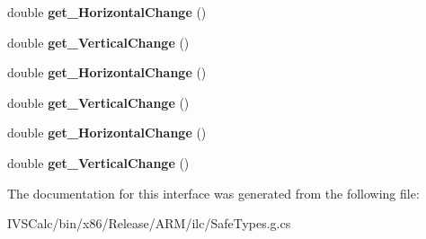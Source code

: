 \begin{DoxyCompactItemize}
double {\bfseries get\+\_\+\+Horizontal\+Change} ()
\item 
\mbox{\label{interface_windows_1_1_u_i_1_1_xaml_1_1_controls_1_1_primitives_1_1_i_drag_delta_event_args_a1bbac76823f97556984152912a0e5e7c}} 
double {\bfseries get\+\_\+\+Vertical\+Change} ()
\item 
\mbox{\label{interface_windows_1_1_u_i_1_1_xaml_1_1_controls_1_1_primitives_1_1_i_drag_delta_event_args_a9e4c99f8e8e4aa64d6a6c0ce91eb070a}} 
double {\bfseries get\+\_\+\+Horizontal\+Change} ()
\item 
\mbox{\label{interface_windows_1_1_u_i_1_1_xaml_1_1_controls_1_1_primitives_1_1_i_drag_delta_event_args_a1bbac76823f97556984152912a0e5e7c}} 
double {\bfseries get\+\_\+\+Vertical\+Change} ()
\item 
\mbox{\label{interface_windows_1_1_u_i_1_1_xaml_1_1_controls_1_1_primitives_1_1_i_drag_delta_event_args_a9e4c99f8e8e4aa64d6a6c0ce91eb070a}} 
double {\bfseries get\+\_\+\+Horizontal\+Change} ()
\item 
\mbox{\label{interface_windows_1_1_u_i_1_1_xaml_1_1_controls_1_1_primitives_1_1_i_drag_delta_event_args_a1bbac76823f97556984152912a0e5e7c}} 
double {\bfseries get\+\_\+\+Vertical\+Change} ()
\end{DoxyCompactItemize}


The documentation for this interface was generated from the following file\+:\begin{DoxyCompactItemize}
\item 
I\+V\+S\+Calc/bin/x86/\+Release/\+A\+R\+M/ilc/Safe\+Types.\+g.\+cs\end{DoxyCompactItemize}

